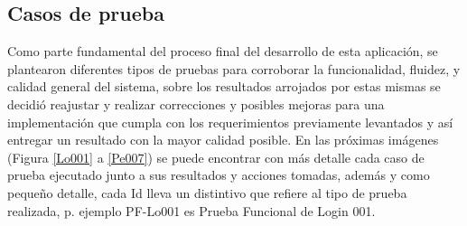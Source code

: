 \documentclass[12pt,letterpaper,spanish]{report}
\begin{document}









\subsection{Casos de prueba}
Como parte fundamental del proceso final del desarrollo de esta aplicación, se plantearon diferentes tipos de pruebas para corroborar la funcionalidad, fluidez, y calidad general del sistema, sobre los resultados arrojados por estas mismas se decidió reajustar y realizar correcciones y posibles mejoras para una implementación que cumpla con los requerimientos previamente levantados y así entregar un resultado con la mayor calidad posible.
En las próximas imágenes (Figura \ref{Lo001} a \ref{Pe007}) se puede encontrar con más detalle cada caso de prueba ejecutado junto a sus resultados y acciones tomadas, además y como pequeño detalle, cada Id lleva un distintivo que refiere al tipo de prueba realizada, p. ejemplo PF-Lo001 es Prueba Funcional de Login 001.
\end{document}
